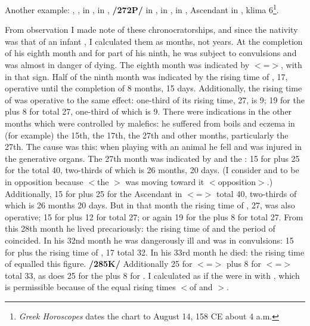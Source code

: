 Another example: \Sun, \Mercury, \Venus\xspace in \Leo, \Moon\xspace in \Virgo, \Saturn\xspace \textbf{/272P/} in \Libra, \Jupiter\xspace in \Capricorn, \Mars\xspace in \Aries, Ascendant in \Cancer, klima 6\footnote{\textit{Greek Horoscopes} dates the chart to August 14, 158 CE about 4 a.m.}.

From observation I made note of these chronocratorships, and since the nativity was that of an infant \mndl, I calculated them as months, not years. At the completion of his eighth month and for part of his ninth, he was subject to convulsions and was almost in danger of dying. The eighth month was indicated by \Libra\xspace $<$=\Venus$>$, with \Saturn\xspace in that sign. Half of the ninth month was indicated by the rising time of \Aries, 17, operative until the completion of 8 months, 15 days. Additionally, the rising time of \Capricorn\xspace was operative to the same effect: one-third of its rising time, 27, is 9; 19 for the \Sun\xspace plus 8 for \Venus\xspace total 27, one-third of which is 9. There were indications in the other months which were controlled by malefics: he suffered from boils and eczema in (for example) the 15th, the 17th, the 27th and other months, particularly the 27th. The cause was this: when playing with
an animal he fell and was injured in the generative organs. The 27th month was indicated by \Mars\xspace and the \Moon: 15 for \Mars\xspace plus 25 for the \Moon\xspace total 40, two-thirds of which is 26 months, 20 days. (I consider \Aries\xspace and \Virgo\xspace to be in opposition because $<$the \Moon$>$ was moving toward it $<$opposition$>$.) Additionally, 15 for \Mars\xspace plus 25 for the Ascendant in \Cancer\xspace $<$=\Moon$>$ total 40, two-thirds of which is 26 months 20 days. But in that month the rising time of \Capricorn, 27, was also operative; 15 for \Mars\xspace plus 12 for \Jupiter\xspace total 27; or again 19 for the \Sun\xspace plus 8 for \Venus\xspace total 27. From this 28th month he lived precariously: the rising time of \Libra\xspace and the period of \Saturn\xspace coincided. In his 32nd month he was dangerously ill and was in convulsions: 15 for \Mars\xspace plus the rising time of \Aries, 17 total 32. In his 33rd month he died: the rising time of \Cancer\xspace equalled this figure. \textbf{/285K/} Additionally 25 for \Cancer\xspace $<$=\Moon$>$ plus 8 for \Libra\xspace $<$=\Venus$>$ total 33, as does 25 for the \Moon\xspace plus 8 for \Libra. I calculated as if the \Moon\xspace were in \Libra\xspace with \Saturn, which is permissible because of the equal rising times $<$of \Virgo\xspace and \Libra$>$.

